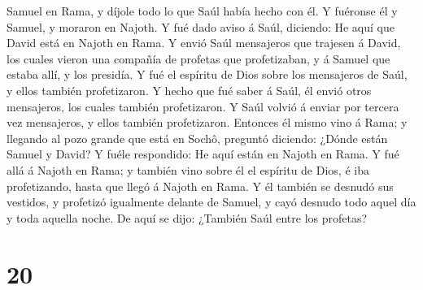 Samuel en Rama, y díjole todo lo que Saúl había hecho con él. Y fuéronse
él y Samuel, y moraron en Najoth.  Y fué dado aviso á
Saúl, diciendo: He aquí que David está en Najoth en Rama.
 Y envió Saúl mensajeros que trajesen á David, los cuales
vieron una compañía de profetas que profetizaban, y á Samuel que estaba
allí, y los presidía. Y fué el espíritu de Dios sobre los mensajeros de
Saúl, y ellos también profetizaron.  Y hecho que fué
saber á Saúl, él envió otros mensajeros, los cuales también
profetizaron. Y Saúl volvió á enviar por tercera vez mensajeros, y ellos
también profetizaron.  Entonces él mismo vino á Rama; y
llegando al pozo grande que está en Sochô, preguntó diciendo: ¿Dónde
están Samuel y David? Y fuéle respondido: He aquí están en Najoth en
Rama.  Y fué allá á Najoth en Rama; y también vino sobre
él el espíritu de Dios, é iba profetizando, hasta que llegó á Najoth en
Rama.  Y él también se desnudó sus vestidos, y profetizó
igualmente delante de Samuel, y cayó desnudo todo aquel día y toda
aquella noche. De aquí se dijo: ¿También Saúl entre los profetas?

\hypertarget{section-19}{%
\section{20}\label{section-19}}


